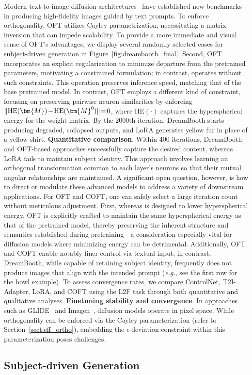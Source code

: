 Modern text-to-image diffusion architectures~\cite{saharia2022photorealistic,ramesh2022hierarchical,rombach2022high} have established new benchmarks in producing high-fidelity images guided by text prompts. To enforce orthogonality, OFT utilizes Cayley parametrization, necessitating a matrix inversion that can impede scalability. To provide a more immediate and visual sense of OFT’s advantages, we display several randomly selected cases for subject-driven generation in Figure~\ref{fig:dreambooth_final}. Second, OFT incorporates an explicit regularization to minimize departure from the pretrained parameters, motivating a constrained formulation; in contrast, \cite{liu2021orthogonal} operates without such constraints. This operation preserves inference speed, matching that of the base pretrained model. In contrast, OFT employs a different kind of constraint, focusing on preserving pairwise neuron similarities by enforcing $\thickmuskip=2mu \medmuskip=2mu \| \text{HE}(\bm{M})-\text{HE}(\bm{M}^0) \|=0$, where $\text{HE}(\cdot)$ captures the hyperspherical energy for the weight matrix. By the 2000th iteration, DreamBooth starts producing degraded, collapsed outputs, and LoRA generates yellow fur in place of a yellow shirt. \textbf{Quantitative comparison}. Within 400 iterations, DreamBooth and OFT-based approaches successfully capture the desired content, whereas LoRA fails to maintain subject identity. This approach involves learning an orthogonal transformation common to each layer’s neurons so that their mutual angular relationships are maintained. A significant open question, however, is how to direct or modulate these advanced models to address a variety of downstream applications. For OFT and COFT, one can safely select a large iteration count without meticulous adjustment. First, whereas \cite{liu2021orthogonal} is designed to lower hyperspherical energy, OFT is explicitly crafted to maintain the same hyperspherical energy as that of the pretrained model, thereby preserving the inherent structure and semantics established during pretraining—a consideration especially vital for diffusion models where minimizing energy can be detrimental. Additionally, OFT and COFT enable notably finer control via textual input; in contrast, DreamBooth, while capable of retaining subject identity, frequently does not produce images that align with the intended prompt (\emph{e.g.}, see the first row for the bowl example). To assess convergence rates, we compare ControlNet, T2I-Adapter, LoRA, and COFT using the L2F task through both quantitative and qualitative analyses. \textbf{Finetuning stability and convergence}. In approaches such as GLIDE~\cite{nichol2022glide} and Imagen~\cite{saharia2022photorealistic}, diffusion models operate in pixel space. While orthogonality can be enforced via the Cayley parameterization (refer to Section~\ref{sect:eff_ortho}), embedding the $\epsilon$-deviation constraint within this parameterization poses challenges. \subsection{Subject-driven Generation}

